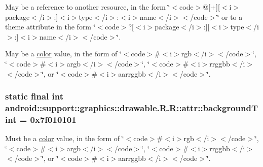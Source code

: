 May be a reference to another resource, in the form \char`\"{}$<$code$>$@\mbox{[}+\mbox{]}\mbox{[}$<$i$>$package$<$/i$>$:\mbox{]}$<$i$>$type$<$/i$>$:$<$i$>$name$<$/i$>$$<$/code$>$\char`\"{} or to a theme attribute in the form \char`\"{}$<$code$>$?\mbox{[}$<$i$>$package$<$/i$>$:\mbox{]}\mbox{[}$<$i$>$type$<$/i$>$:\mbox{]}$<$i$>$name$<$/i$>$$<$/code$>$\char`\"{}. 

May be a \hyperlink{classandroid_1_1support_1_1graphics_1_1drawable_1_1_r_1_1color}{color} value, in the form of \char`\"{}$<$code$>$\#$<$i$>$rgb$<$/i$>$$<$/code$>$\char`\"{}, \char`\"{}$<$code$>$\#$<$i$>$argb$<$/i$>$$<$/code$>$\char`\"{}, \char`\"{}$<$code$>$\#$<$i$>$rrggbb$<$/i$>$$<$/code$>$\char`\"{}, or \char`\"{}$<$code$>$\#$<$i$>$aarrggbb$<$/i$>$$<$/code$>$\char`\"{}. \hypertarget{classandroid_1_1support_1_1graphics_1_1drawable_1_1_r_1_1attr_a3166a7f244a714503e653aad05d1854}{
\subsubsection[{backgroundTint}]{\setlength{\rightskip}{0pt plus 5cm}static final int android::support::graphics::drawable.R.R::attr::backgroundTint = 0x7f010101}}
\label{classandroid_1_1support_1_1graphics_1_1drawable_1_1_r_1_1attr_a3166a7f244a714503e653aad05d1854}


Must be a \hyperlink{classandroid_1_1support_1_1graphics_1_1drawable_1_1_r_1_1color}{color} value, in the form of \char`\"{}$<$code$>$\#$<$i$>$rgb$<$/i$>$$<$/code$>$\char`\"{}, \char`\"{}$<$code$>$\#$<$i$>$argb$<$/i$>$$<$/code$>$\char`\"{}, \char`\"{}$<$code$>$\#$<$i$>$rrggbb$<$/i$>$$<$/code$>$\char`\"{}, or \char`\"{}$<$code$>$\#$<$i$>$aarrggbb$<$/i$>$$<$/code$>$\char`\"{}. 

